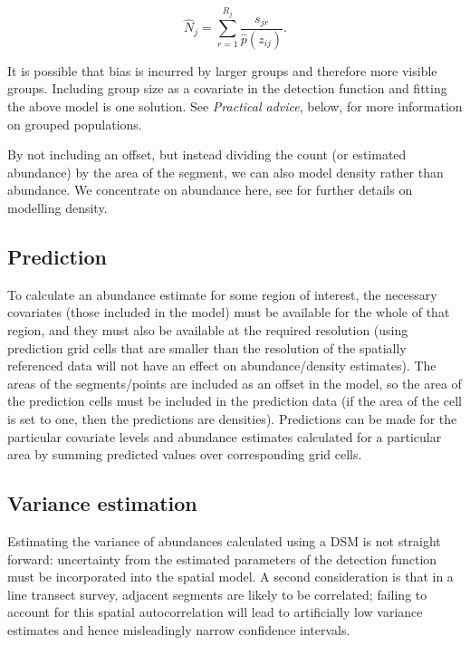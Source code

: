 \documentclass[a4paper,12pt]{article}
\begin{document}
\begin{equation*}
\hat{N}_j = \sum_{r=1}^{R_j} \frac{s_{jr}}{\hat{p}(z_{ij})}.
\end{equation*}

It is possible that bias is incurred by larger groups and therefore more visible groups. Including group size as a covariate in the detection function and fitting the above model is one solution. See \textit{Practical advice}, below, for more information on grouped populations.

By not including an offset, but instead dividing the count (or estimated abundance) by the area of the segment, we can also model density rather than abundance. We concentrate on abundance here, see \cite{Hedley:2004et} for further details on modelling density.

\subsection*{Prediction}

To calculate an abundance estimate for some region of interest, the necessary covariates (those included in the model) must be available for the whole of that region, and they must also be available at the required resolution (using prediction grid cells that are smaller than the resolution of the spatially referenced data will not have an effect on abundance/density estimates). The areas of the segments/points are included as an offset in the model, so the area of the prediction cells must be included in the prediction data (if the area of the cell is set to one, then the predictions are densities). Predictions can be made for the particular covariate levels and abundance estimates calculated for a particular area by summing predicted values over corresponding grid cells.


\subsection*{Variance estimation}

Estimating the variance of abundances calculated using a DSM is not straight forward: uncertainty from the estimated parameters of the detection function must be incorporated into the spatial model. A second consideration is that in a line transect survey, adjacent segments are likely to be correlated; failing to account for this spatial autocorrelation will lead to artificially low variance estimates and hence misleadingly narrow confidence intervals.
\end{document}
